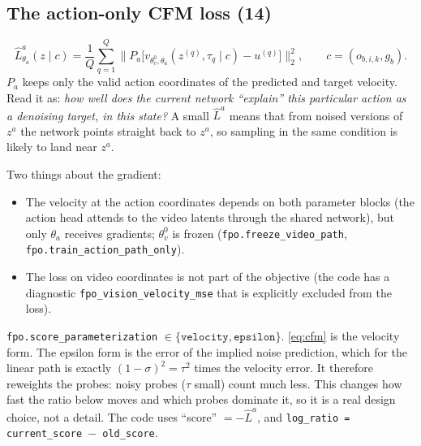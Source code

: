 \documentclass[11pt,a4paper]{article}
\newcommand{\thv}{\theta_v^{0}}
\newcommand{\tha}{\theta_a}
\newcommand{\Lh}{\hat L^{a}}
\newcommand{\eqp}[1]{\textup{(#1)}} %
\theoremstyle{remark}
\begin{document}
\subsection{The action-only CFM loss \eqp{14}}
\begin{equation}
\Lh_{\tha}(z\mid c)=\frac1Q\sum_{q=1}^{Q}\Big\|P_a\big[v_{\thv,\tha}(z^{(q)},\tau_q\mid c)-u^{(q)}\big]\Big\|_2^2,\qquad c=(o_{b,i,k},g_b).
\label{eq:cfm}
\end{equation}
$P_a$ keeps only the valid action coordinates of the predicted and target velocity. Read it as: \emph{how well does the current network ``explain'' this particular action as a denoising target, in this state?} A small $\Lh$ means that from noised versions of $z^a$ the network points straight back to $z^a$, so sampling in the same condition is likely to land near $z^a$.

Two things about the gradient:
\begin{itemize}
\item The velocity at the action coordinates depends on both parameter blocks (the action head attends to the video latents through the shared network), but only $\tha$ receives gradients; $\thv$ is frozen (\texttt{fpo.freeze\_video\_path}, \texttt{fpo.train\_action\_path\_only}).
\item The loss on video coordinates is not part of the objective (the code has a diagnostic \texttt{fpo\_vision\_velocity\_mse} that is explicitly excluded from the loss).
\end{itemize}

\begin{codenote}
\texttt{fpo.score\_parameterization} $\in\{\texttt{velocity},\texttt{epsilon}\}$. \eqref{eq:cfm} is the velocity form. The epsilon form is the error of the implied noise prediction, which for the linear path is exactly $(1-\sigma)^2=\tau^2$ times the velocity error. It therefore reweights the probes: noisy probes ($\tau$ small) count much less. This changes how fast the ratio below moves and which probes dominate it, so it is a real design choice, not a detail. The code uses ``score'' $=-\Lh$, and \texttt{log\_ratio = current\_score $-$ old\_score}.
\end{codenote}
\end{document}
